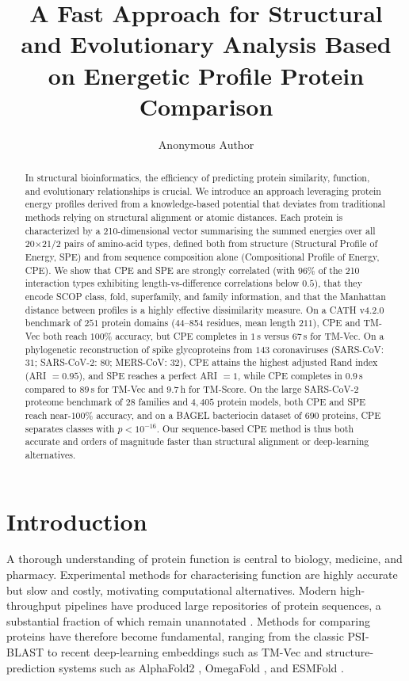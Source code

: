 \documentclass[11pt]{article}
\title{A Fast Approach for Structural and Evolutionary Analysis Based on Energetic Profile Protein Comparison}
\author[1]{Anonymous Author}
\affil[1]{Anonymous Institution}
\date{}
\begin{document}
\maketitle

\begin{abstract}
In structural bioinformatics, the efficiency of predicting protein similarity, function, and evolutionary relationships is crucial. We introduce an approach leveraging protein energy profiles derived from a knowledge-based potential that deviates from traditional methods relying on structural alignment or atomic distances. Each protein is characterized by a 210-dimensional vector summarising the summed energies over all 20$\times$21/2 pairs of amino-acid types, defined both from structure (Structural Profile of Energy, SPE) and from sequence composition alone (Compositional Profile of Energy, CPE). We show that CPE and SPE are strongly correlated (with $96\%$ of the 210 interaction types exhibiting length-vs-difference correlations below $0.5$), that they encode SCOP class, fold, superfamily, and family information, and that the Manhattan distance between profiles is a highly effective dissimilarity measure. On a CATH v4.2.0 benchmark of $251$ protein domains (44--854 residues, mean length $211$), CPE and TM-Vec both reach $100\%$ accuracy, but CPE completes in $1$\,s versus $67$\,s for TM-Vec. On a phylogenetic reconstruction of spike glycoproteins from $143$ coronaviruses (SARS-CoV: $31$; SARS-CoV-2: $80$; MERS-CoV: $32$), CPE attains the highest adjusted Rand index (ARI $= 0.95$), and SPE reaches a perfect ARI $=1$, while CPE completes in $0.9$\,s compared to $89$\,s for TM-Vec and $9.7$\,h for TM-Score. On the large SARS-CoV-2 proteome benchmark of $28$ families and $4{,}405$ protein models, both CPE and SPE reach near-$100\%$ accuracy, and on a BAGEL bacteriocin dataset of $690$ proteins, CPE separates classes with $p<10^{-16}$. Our sequence-based CPE method is thus both accurate and orders of magnitude faster than structural alignment or deep-learning alternatives.
\end{abstract}

\section{Introduction}

A thorough understanding of protein function is central to biology, medicine, and pharmacy. Experimental methods for characterising function are highly accurate but slow and costly, motivating computational alternatives. Modern high-throughput pipelines have produced large repositories of protein sequences, a substantial fraction of which remain unannotated \cite{uniprot2021}. Methods for comparing proteins have therefore become fundamental, ranging from the classic PSI-BLAST \cite{altschul1997psiblast} to recent deep-learning embeddings such as TM-Vec \cite{hamamsy2023tmvec} and structure-prediction systems such as AlphaFold2 \cite{jumper2021alphafold2}, OmegaFold \cite{wu2022omegafold}, and ESMFold \cite{lin2023esmfold}.
\end{document}
